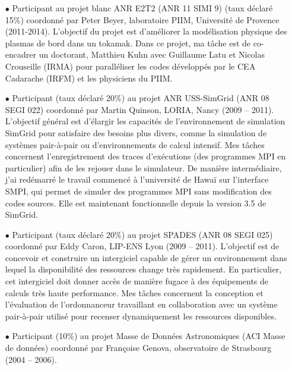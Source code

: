 \documentclass[11pt]{article}
\begin{document}
\begin{itemize}
\item[$\bullet$]
Participant au projet blanc ANR E2T2 (ANR 11 SIMI 9) (taux déclaré 15\%) coordonné par 
Peter Beyer, laboratoire PIIM, Université de Provence (2011-2014). L'objectif du projet 
est d'améliorer la modélisation physique des plasmas de bord dans un tokamak. Dans ce
projet, ma tâche est de co-encadrer un doctorant, Matthieu Kuhn avec Guillaume Latu et
Nicolas Crouseille (IRMA) pour paralléliser les codes développés par le CEA Cadarache 
(IRFM) et les physiciens du PIIM. \\

\item[$\bullet$]
Participant (taux déclaré 20\%) au projet ANR USS-SimGrid (ANR 08 SEGI 022) coordonné par 
Martin Quinson, LORIA, Nancy (2009 -- 2011). L'objectif général est d'élargir les capacités 
de l'environnement de simulation SimGrid pour satisfaire des besoins plus divers, comme la
simulation de systèmes pair-à-pair ou d'environnements de calcul intensif.
Mes tâches concernent l'enregistrement des traces d'exécutions (des programmes MPI en 
particulier) afin de les rejouer dans le simulateur. De manière intermédiaire, j'ai redémarré
le travail commencé à l'université de Hawaï sur l'interface SMPI, qui permet de simuler des 
programmes MPI sans modification des codes sources. Elle est maintenant fonctionnelle depuis
la version 3.5 de SimGrid.\\


\item[$\bullet$]
Participant (taux déclaré 20\%) au projet SPADES (ANR 08 SEGI 025) coordonné par Eddy Caron, 
LIP-ENS Lyon (2009 -- 2011). L'objectif est de concevoir et construire un intergiciel capable 
de gérer un environnement dans lequel la disponibilité des ressources change très rapidement. 
En particulier, cet intergiciel doit donner accès de manière fugace à des équipements de calculs 
très haute performance. Mes tâches concernent la conception et l'évaluation de l'ordonnanceur
travaillant en collaboration avec un système pair-à-pair utilisé pour recenser dynamiquement
les ressources disponibles.\\


\item[$\bullet$] Participant (10\%) au projet Masse de Données Astronomiques (ACI Masse de données) 
coordonné par Françoise Genova, observatoire de Strasbourg (2004 -- 2006). \\
\end{itemize}
\end{document}
